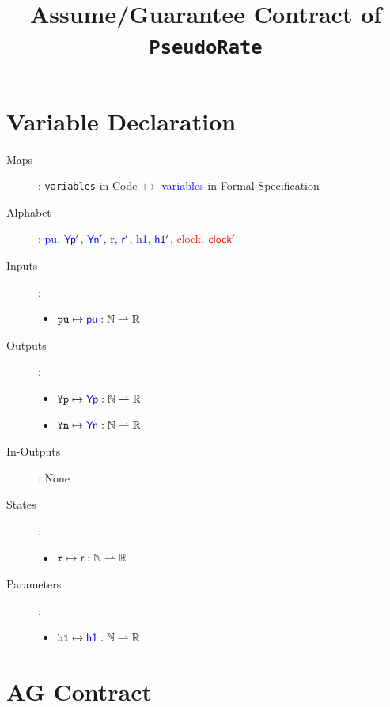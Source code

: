 \documentclass[fleqn,a4paper]{article}
\newcommand\var[1]{\texttt{#1}}
\newcommand\Var[1]{\textcolor{blue}{\textsf{#1}}}
\newcommand\clock{\textcolor{red}{\textsf{clock}}}
\begin{document}
\title{Assume/Guarantee Contract of \texttt{PseudoRate}}
\author{}

\maketitle

\section{Variable Declaration}

\begin{description}
\item[Maps]:
\var{variables} in Code $\mapsto$ \Var{variables} in Formal Specification

\item[Alphabet]:
\Var{pu},
$\Var{Yp}'$,
$\Var{Yn}'$,
\Var{r},
$\Var{r}'$,
\Var{h1},
$\Var{h1}'$,
\clock,
$\clock'$

\item[Inputs]:
\begin{itemize}
\item $\var{pu} \mapsto \Var{pu} : \mathbb{N} \rightharpoonup \mathbb{R}$
\end{itemize}

\item[Outputs]:
\begin{itemize}
\item $\var{Yp} \mapsto \Var{Yp} : \mathbb{N} \rightharpoonup \mathbb{R}$
\item $\var{Yn} \mapsto \Var{Yn} : \mathbb{N} \rightharpoonup \mathbb{R}$
\end{itemize}

\item[In-Outputs]: None

\item[States]: 
\begin{itemize}
\item $\var{r}\mapsto\Var{r}:\mathbb{N}\rightharpoonup\mathbb{R}$
\end{itemize}

\item[Parameters]: 
\begin{itemize}
\item $\var{h1}\mapsto\Var{h1}:\mathbb{N}\rightharpoonup\mathbb{R}$
\end{itemize}
\end{description}

\newpage

\section{AG Contract}
\end{document}
